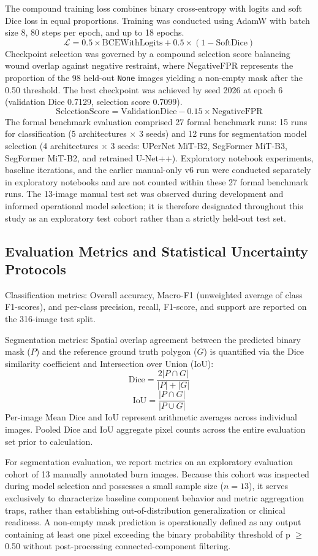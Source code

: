 \documentclass[11pt,a4paper]{article}
\begin{document}
The compound training loss combines binary cross-entropy with logits and soft Dice loss in equal proportions. Training was conducted using AdamW with batch size 8, 80 steps per epoch, and up to 18 epochs.
$$\mathcal{L} = 0.5 \times \text{BCEWithLogits} + 0.5 \times (1 - \text{SoftDice})$$
Checkpoint selection was governed by a compound selection score balancing wound overlap against negative restraint, where NegativeFPR represents the proportion of the 98 held-out \texttt{None} images yielding a non-empty mask after the 0.50 threshold. The best checkpoint was achieved by seed 2026 at epoch 6 (validation Dice 0.7129, selection score 0.7099).
$$\text{SelectionScore} = \text{ValidationDice} - 0.15 \times \text{NegativeFPR}$$
The formal benchmark evaluation comprised 27 formal benchmark runs: 15 runs for classification (5 architectures $\times$ 3 seeds) and 12 runs for segmentation model selection (4 architectures $\times$ 3 seeds: UPerNet MiT-B2, SegFormer MiT-B3, SegFormer MiT-B2, and retrained U-Net++). Exploratory notebook experiments, baseline iterations, and the earlier manual-only v6 run were conducted separately in exploratory notebooks and are not counted within these 27 formal benchmark runs. The 13-image manual test set was observed during development and informed operational model selection; it is therefore designated throughout this study as an exploratory test cohort rather than a strictly held-out test set.

\subsection{Evaluation Metrics and Statistical Uncertainty Protocols}

Classification metrics: Overall accuracy, Macro-F1 (unweighted average of class F1-scores), and per-class precision, recall, F1-score, and support are reported on the 316-image test split.

Segmentation metrics: Spatial overlap agreement between the predicted binary mask ($P$) and the reference ground truth polygon ($G$) is quantified via the Dice similarity coefficient and Intersection over Union (IoU):
$$\text{Dice} = \frac{2 |P \cap G|}{|P| + |G|}$$
$$\text{IoU} = \frac{|P \cap G|}{|P \cup G|}$$
Per-image Mean Dice and IoU represent arithmetic averages across individual images. Pooled Dice and IoU aggregate pixel counts across the entire evaluation set prior to calculation.

For segmentation evaluation, we report metrics on an exploratory evaluation cohort of 13 manually annotated burn images. Because this cohort was inspected during model selection and possesses a small sample size ($n = 13$), it serves exclusively to characterize baseline component behavior and metric aggregation traps, rather than establishing out-of-distribution generalization or clinical readiness. A non-empty mask prediction is operationally defined as any output containing at least one pixel exceeding the binary probability threshold of p $\ge$ 0.50 without post-processing connected-component filtering.
\end{document}
